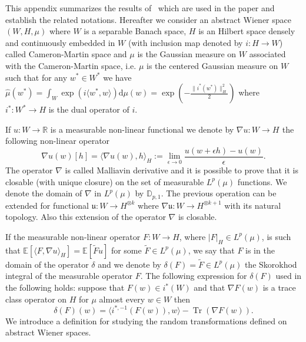 \documentclass[a4paper,10pt]{article}
\newcommand{\assign}{:=}
\newcommand{\asterisk}{\mathord{*}}
\newcommand{\mathd}{\mathrm{d}}
\newcommand{\tmop}[1]{\ensuremath{\operatorname{#1}}}
\begin{document}
This appendix summarizes the results of~{\cite{Ustunel2000}} which are used in
the paper and establish the related notations. Hereafter we consider an
abstract Wiener space $(W, H, \mu)$ where $W$ is a separable Banach space, $H$
is an Hilbert space densely and continuously embedded in $W$ (with inclusion
map denoted by $i : H \rightarrow W$) called Cameron-Martin space and $\mu$ is
the Gaussian measure on $W$ associated with the Cameron-Martin space, i.e.
$\mu$ is the centered Gaussian measure on $W$ such that for any $w^{\asterisk}
\in W^{\asterisk}$ we have $\hat{\mu} (w^{\asterisk}) = \int_W \exp (i \langle
w^{\asterisk}, w \rangle) \mathd \mu (w) = \exp \left( - \frac{\|
i^{\asterisk} (w^{\asterisk}) \|_H^2}{2} \right)$ where $i^{\asterisk} :
W^{\asterisk} \rightarrow H$ is the dual operator of $i$.

If $u : W \rightarrow \mathbb{R}$ is a measurable non-linear functional we
denote by $\nabla u : W \rightarrow H^{}$ the following non-linear operator
\[ \nabla u (w) [h] = \langle \nabla u (w), h \rangle_H \assign
   \lim_{\epsilon \rightarrow 0} \frac{u (w + \epsilon h) - u (w)}{\epsilon} .
\]
The operator $\nabla$ is called Malliavin derivative and it is possible to
prove that it is closable (with unique closure) on the set of measurable $L^p
(\mu)$ functions. We denote the domain of $\nabla$ in $L^p (\mu)$ by
$\mathbb{D}_{p, 1}$. The previous operation can be extended for functional
$\mathfrak{u} : W \rightarrow H^{\otimes k}$ where $\nabla \mathfrak{u} : W
\rightarrow H^{\otimes k + 1}$ with its natural topology. Also this extension
of the operator $\nabla$ is closable.

If the measurable non-linear operator $F : W \rightarrow H$, where $| F |_H
\in L^p (\mu)$, is such that $\mathbb{E} [\langle F, \nabla u \rangle_H]
=\mathbb{E} [\tilde{F} u]$ for some $\tilde{F} \in L^p (\mu)$, we say that $F$
is in the domain of the operator $\delta$ and we denote by $\delta (F) =
\tilde{F} \in L^p (\mu)$ the Skorokhod integral of the measurable operator
$F$. The following expression for $\delta (F)$ used in the following holds:
suppose that $F (w) \in i^{\asterisk} (W)$ and that $\nabla F (w)$ is a trace
class operator on $H$ for $\mu$ almost every $w \in W$ then
\begin{equation}
  \delta (F) (w) = \langle i^{\asterisk, - 1} (F (w)), w \rangle - \tmop{Tr}
  (\nabla F (w)) . \label{equationwienerspace1}
\end{equation}
We introduce a definition for studying the random transformations defined on
abstract Wiener spaces.
\end{document}
